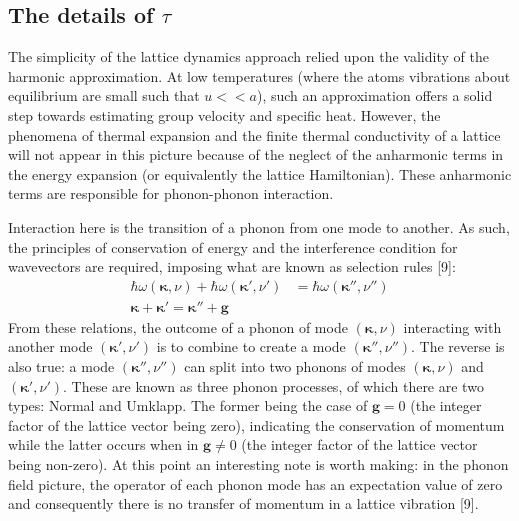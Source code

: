\documentclass{article}
\numberwithin{equation}{section}
\begin{document}
\subsection{The details of $\tau$}
The simplicity of the lattice dynamics approach relied upon the validity of the harmonic approximation. At low temperatures (where the atoms vibrations about equilibrium are small such that $u<<a$), such an approximation offers a solid step towards estimating group velocity and specific heat. However, the phenomena of thermal expansion and the finite thermal conductivity of a lattice will not appear in this picture because of the neglect of the anharmonic terms in the energy expansion (or equivalently the lattice Hamiltonian). These anharmonic terms are responsible for phonon-phonon interaction.

Interaction here is the transition of a phonon from one mode to another. As such, the principles of conservation of energy and the interference condition for wavevectors are required, imposing what are known as selection rules [9]:
\begin{align*}
	\hbar\omega(\pmb{\kappa},\nu)+\hbar\omega(\pmb{\kappa}',\nu')&=\hbar\omega(\pmb{\kappa}'',\nu'')\\
	\pmb{\kappa}+\pmb{\kappa'}=\pmb{\kappa''}+\pmb{g}
\end{align*}
From these relations, the outcome of a phonon of mode $(\pmb{\kappa},\nu)$ interacting with another mode $(\pmb{\kappa'},\nu')$ is to combine to create a mode $(\pmb{\kappa}'',\nu'')$. The reverse is also true: a mode $(\pmb{\kappa}'',\nu'')$ can split into two phonons of modes $(\pmb{\kappa},\nu)$ and $(\pmb{\kappa'},\nu')$. These are known as three phonon processes, of which there are two types: Normal and Umklapp. The former being the case of $\pmb{g}=0$ (the integer factor of the lattice vector being zero), indicating the conservation of momentum while the latter occurs when in $\pmb{g}\neq 0$ (the integer factor of the lattice vector being non-zero). At this point an interesting note is worth making: in the phonon field picture, the operator of each phonon mode has an expectation value of zero and consequently there is no transfer of momentum in a lattice vibration [9].
\end{document}
